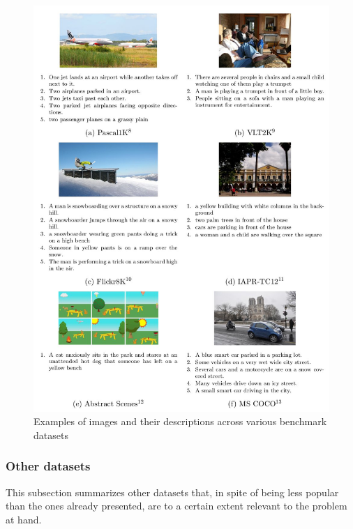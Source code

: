 \begin{figure}[hpt]
    \centering
    \includegraphics[scale=0.45]{images/ch2/image-caption-examples.jpg}
    \caption{Examples of images and their descriptions across various benchmark datasets}
    \label{fig:samples}
\end{figure}

\subsubsection{Other datasets}

This subsection summarizes other datasets that, in spite of being less popular than the ones already presented,  are to a certain extent relevant to the problem at hand.

